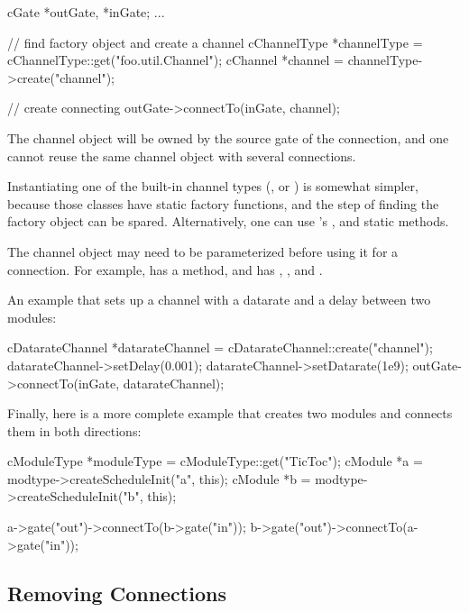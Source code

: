 \begin{ned}
\begin{cpp}
cGate *outGate, *inGate;
...

// find factory object and create a channel
cChannelType *channelType = cChannelType::get("foo.util.Channel");
cChannel *channel = channelType->create("channel");

// create connecting
outGate->connectTo(inGate, channel);
\end{cpp}

The channel object will be owned by the source gate of the connection, and
one cannot reuse the same channel object with several connections.

Instantiating one of the built-in channel types (,
 or ) is somewhat simpler,
because those classes have static  factory functions, and the
step of finding the factory object can be spared. Alternatively, one can use
's , 
and  static methods.

The channel object may need to be parameterized before using it for a
connection. For example,  has a 
method, and  has ,
,  and
.

An example that sets up a channel with a datarate and a delay between two
modules:

\begin{cpp}
cDatarateChannel *datarateChannel = cDatarateChannel::create("channel");
datarateChannel->setDelay(0.001);
datarateChannel->setDatarate(1e9);
outGate->connectTo(inGate, datarateChannel);
\end{cpp}

Finally, here is a more complete example that creates two modules and
connects them in both directions:

\begin{cpp}
cModuleType *moduleType = cModuleType::get("TicToc");
cModule *a = modtype->createScheduleInit("a", this);
cModule *b = modtype->createScheduleInit("b", this);

a->gate("out")->connectTo(b->gate("in"));
b->gate("out")->connectTo(a->gate("in"));
\end{cpp}


\subsection{Removing Connections}
\label{sec:simple-modules:removing-connections}


\end{ned}
